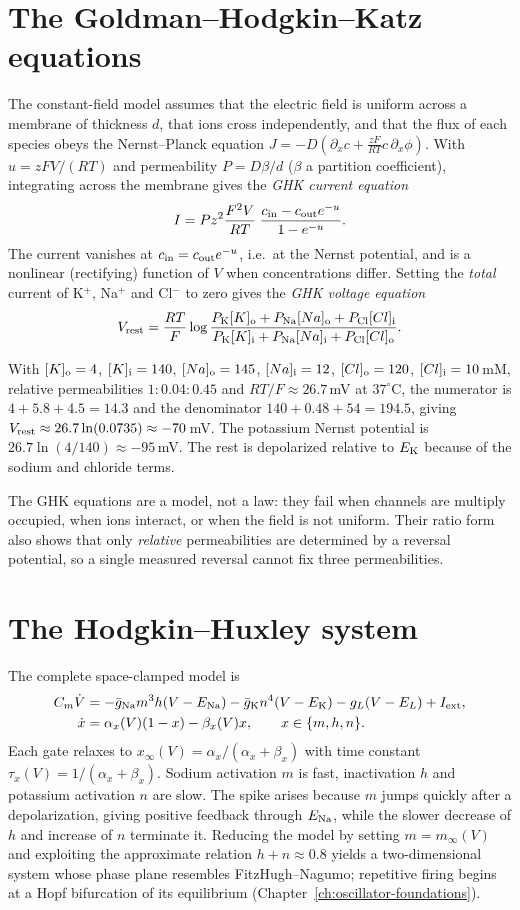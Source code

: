 \section{The Goldman--Hodgkin--Katz equations}
The constant-field model assumes that the electric field is uniform
across a membrane of thickness $d$, that ions cross independently, and
that the flux of each species obeys the Nernst--Planck equation
$J=-D(\partial_xc+\frac{zF}{RT}c\,\partial_x\phi)$. With
$u=zFV/(RT)$ and permeability $P=D\beta/d$ ($\beta$ a partition
coefficient), integrating across the membrane gives the
\emph{GHK current equation}
\[
I=P z^2\frac{F^2V}{RT}\;\frac{c_{\rm in}-c_{\rm out}e^{-u}}{1-e^{-u}}.
\]
The current vanishes at $c_{\rm in}=c_{\rm out}e^{-u}$, i.e.\ at the
Nernst potential, and is a nonlinear (rectifying) function of $V$ when
concentrations differ. Setting the \emph{total} current of K$^+$,
Na$^+$ and Cl$^-$ to zero gives the \emph{GHK voltage equation}
\[
V_{\rm rest}=\frac{RT}{F}\log\frac{P_{\rm K}[K]_{\rm o}+P_{\rm Na}[Na]_{\rm o}+P_{\rm Cl}[Cl]_{\rm i}}{P_{\rm K}[K]_{\rm i}+P_{\rm Na}[Na]_{\rm i}+P_{\rm Cl}[Cl]_{\rm o}}.
\]
\begin{example}
With $[K]_{\rm o}=4$, $[K]_{\rm i}=140$, $[Na]_{\rm o}=145$,
$[Na]_{\rm i}=12$, $[Cl]_{\rm o}=120$, $[Cl]_{\rm i}=10$\,mM, relative
permeabilities $1:0.04:0.45$ and $RT/F\approx26.7$\,mV at
$37^\circ$C, the numerator is $4+5.8+4.5=14.3$ and the denominator
$140+0.48+54=194.5$, giving $V_{\rm rest}\approx26.7\ln(0.0735)\approx-70$\,mV.
The potassium Nernst potential is $26.7\ln(4/140)\approx-95$\,mV. The
rest is depolarized relative to $E_{\rm K}$ because of the sodium and
chloride terms.
\end{example}
The GHK equations are a model, not a law: they fail when channels are
multiply occupied, when ions interact, or when the field is not uniform.
Their ratio form also shows that only \emph{relative} permeabilities
are determined by a reversal potential, so a single measured reversal
cannot fix three permeabilities.

\section{The Hodgkin--Huxley system}
The complete space-clamped model is
\[
\begin{aligned}
C_m\dot V&=-\bar g_{\rm Na}m^3h(V-E_{\rm Na})-\bar g_{\rm K}n^4(V-E_{\rm K})-g_L(V-E_L)+I_{\rm ext},\\
\dot x&=\alpha_x(V)(1-x)-\beta_x(V)x,\qquad x\in\{m,h,n\}.
\end{aligned}
\]
Each gate relaxes to $x_\infty(V)=\alpha_x/(\alpha_x+\beta_x)$ with time
constant $\tau_x(V)=1/(\alpha_x+\beta_x)$. Sodium activation $m$ is fast,
inactivation $h$ and potassium activation $n$ are slow. The spike arises
because $m$ jumps quickly after a depolarization, giving positive
feedback through $E_{\rm Na}$, while the slower decrease of $h$ and
increase of $n$ terminate it. Reducing the model by setting
$m=m_\infty(V)$ and exploiting the approximate relation $h+n\approx0.8$
yields a two-dimensional system whose phase plane resembles
FitzHugh--Nagumo; repetitive firing begins at a Hopf bifurcation of
its equilibrium (Chapter~\ref{ch:oscillator-foundations}).

